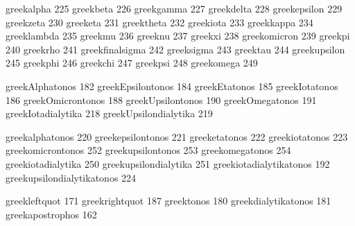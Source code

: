  greekalpha        225
 greekbeta         226
 greekgamma        227
 greekdelta        228
 greekepsilon      229
 greekzeta         230
 greeketa          231
 greektheta        232
 greekiota         233
 greekkappa        234
 greeklambda       235
 greekmu           236
 greeknu           237
 greekxi           238
 greekomicron      239
 greekpi           240
 greekrho          241
 greekfinalsigma   242
 greeksigma        243
 greektau          244
 greekupsilon      245
 greekphi          246
 greekchi          247
 greekpsi          248
 greekomega        249


 greekAlphatonos        182
 greekEpsilontonos      184
 greekEtatonos          185
 greekIotatonos         186
 greekOmicrontonos      188
 greekUpsilontonos      190
 greekOmegatonos        191
 greekIotadialytika     218
 greekUpsilondialytika  219


 greekalphatonos             220
 greekepsilontonos           221
 greeketatonos               222
 greekiotatonos              223
 greekomicrontonos           252
 greekupsilontonos           253
 greekomegatonos             254
 greekiotadialytika          250
 greekupsilondialytika       251
 greekiotadialytikatonos     192
 greekupsilondialytikatonos  224


 greekleftquot               171
 greekrightquot              187
 greektonos                  180
 greekdialytikatonos         181
 greekapostrophos            162

\stopencoding
